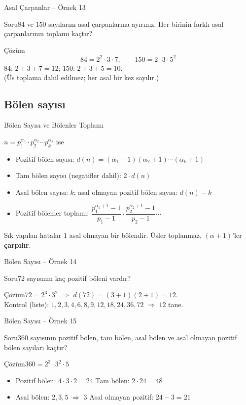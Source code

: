 \documentclass[aspectratio=169,11pt]{beamer}
\newcommand{\soru}[3]{%
\begin{frame}{#1}
  \begin{block}{Soru}\large #2\end{block}
  \pause
  \begin{exampleblock}{Çözüm}\large #3\end{exampleblock}
\end{frame}}
\begin{document}
\soru{Asal Çarpanlar -- Örnek 13}
{\(84\) ve \(150\) sayılarını asal çarpanlarına ayırınız. Her birinin farklı asal çarpanlarının toplamı kaçtır?}
{\[84=2^2\cdot 3\cdot 7,\qquad 150=2\cdot 3\cdot 5^2\]
\(84\): \(2+3+7=12\); \qquad \(150\): \(2+3+5=10\).\\[3pt]
(Üs toplama dahil edilmez; her asal bir kez sayılır.)}

\subsection{Bölen sayısı}
\begin{frame}{Bölen Sayısı ve Bölenler Toplamı}
\begin{block}{\(n=p_1^{\alpha_1}\cdot p_2^{\alpha_2}\cdots p_k^{\alpha_k}\) ise}
\begin{itemize}
\item Pozitif bölen sayısı: \(d(n)=(\alpha_1+1)(\alpha_2+1)\cdots(\alpha_k+1)\)
\item Tam bölen sayısı (negatifler dahil): \(2\cdot d(n)\)
\item Asal bölen sayısı: \(k\); \quad asal olmayan pozitif bölen sayısı: \(d(n)-k\)
\item Pozitif bölenler toplamı: \(\dfrac{p_1^{\alpha_1+1}-1}{p_1-1}\cdot\dfrac{p_2^{\alpha_2+1}-1}{p_2-1}\cdots\)
\end{itemize}
\end{block}
\begin{alertblock}{Sık yapılan hatalar}
\(1\) asal olmayan bir bölendir. \quad Üsler toplanmaz, \((\alpha+1)\)'ler \textbf{çarpılır}.
\end{alertblock}
\end{frame}

\soru{Bölen Sayısı -- Örnek 14}
{\(72\) sayısının kaç pozitif böleni vardır?}
{\(72=2^3\cdot 3^2\) \(\Rightarrow\) \(d(72)=(3+1)(2+1)=12\).\\[3pt]
Kontrol (liste): \(1,2,3,4,6,8,9,12,18,24,36,72\) \(\Rightarrow\) \(12\) tane.}

\soru{Bölen Sayısı -- Örnek 15}
{\(360\) sayısının pozitif bölen, tam bölen, asal bölen ve asal olmayan pozitif bölen sayıları kaçtır?}
{\(360=2^3\cdot 3^2\cdot 5\)
\begin{itemize}
\item Pozitif bölen: \(4\cdot 3\cdot 2=24\) \quad Tam bölen: \(2\cdot 24=48\)
\item Asal bölen: \(2,3,5\) \(\Rightarrow\) \(3\) \quad Asal olmayan pozitif: \(24-3=21\)
\end{itemize}}
\end{document}
